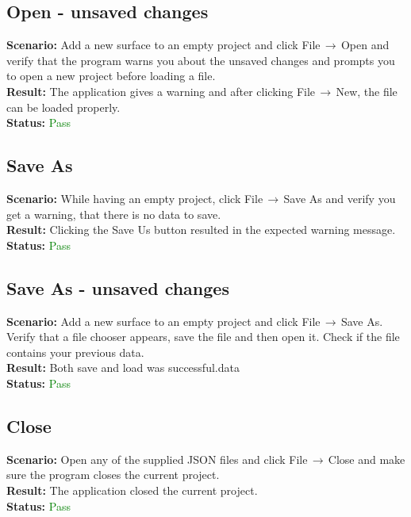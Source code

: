\documentclass[a4paper, 11pt, article]{report}
\begin{document}
\subsection{Open - unsaved changes}

\noindent \textbf{Scenario:} Add a new surface to an empty project and click File$\,\to\,$Open and verify that the program warns you about the unsaved changes and prompts you to open a new project before loading a file.
\\
\noindent \textbf{Result:} The application gives a warning and after clicking File$\,\to\,$New, the file can be loaded properly.
\\
\noindent \textbf{Status:} \textcolor{green}{Pass}

\subsection{Save As}

\noindent \textbf{Scenario:} While having an empty project, click File$\,\to\,$Save As and verify you get a warning, that there is no data to save.
\\
\noindent \textbf{Result:} Clicking the Save Us button resulted in the expected warning message.
\\
\noindent \textbf{Status:} \textcolor{green}{Pass}

\subsection{Save As - unsaved changes}

\noindent \textbf{Scenario:} Add a new surface to an empty project and click File$\,\to\,$Save As. Verify that a file chooser appears, save the file and then open it. Check if the file contains your previous data.
\\
\noindent \textbf{Result:} Both save and load was successful.data
\\
\noindent \textbf{Status:} \textcolor{green}{Pass}

\subsection{Close}

\noindent \textbf{Scenario:} Open any of the supplied JSON files and click File$\,\to\,$Close and make sure the program closes the current project. 
\\
\noindent \textbf{Result:} The application closed the current project.
\\
\noindent \textbf{Status:} \textcolor{green}{Pass}
\end{document}
